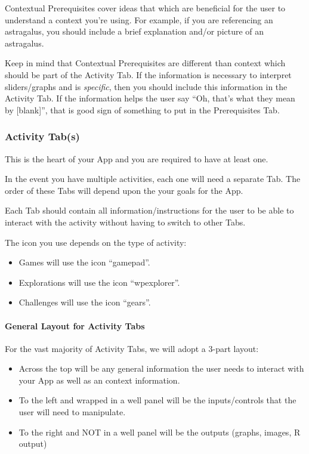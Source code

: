 \documentclass[
]{book}
\providecommand{\tightlist}{%
  \setlength{\itemsep}{0pt}\setlength{\parskip}{0pt}}
\begin{document}
Contextual Prerequisites cover ideas that which are beneficial for the user to understand a context you're using. For example, if you are referencing an astragalus, you should include a brief explanation and/or picture of an astragalus.

Keep in mind that Contextual Prerequisites are different than context which should be part of the Activity Tab. If the information is necessary to interpret sliders/graphs and is \emph{specific}, then you should include this information in the Activity Tab. If the information helps the user say ``Oh, that's what they mean by {[}blank{]}'', that is good sign of something to put in the Prerequisites Tab.

\hypertarget{activity-tabs}{%
\subsubsection{Activity Tab(s)}\label{activity-tabs}}

This is the heart of your App and you are required to have at least one.

In the event you have multiple activities, each one will need a separate Tab. The order of these Tabs will depend upon the your goals for the App.

Each Tab should contain all information/instructions for the user to be able to interact with the activity without having to switch to other Tabs.

The icon you use depends on the type of activity:

\begin{itemize}
\tightlist
\item
  Games will use the icon ``gamepad''.
\item
  Explorations will use the icon ``wpexplorer''.
\item
  Challenges will use the icon ``gears''.
\end{itemize}

\hypertarget{general-layout-for-activity-tabs}{%
\paragraph{General Layout for Activity Tabs}\label{general-layout-for-activity-tabs}}

For the vast majority of Activity Tabs, we will adopt a 3-part layout:

\begin{itemize}
\tightlist
\item
  Across the top will be any general information the user needs to interact with your App as well as an context information.
\item
  To the left and wrapped in a well panel will be the inputs/controls that the user will need to manipulate.
\item
  To the right and NOT in a well panel will be the outputs (graphs, images, R output)
\end{itemize}
\end{document}
